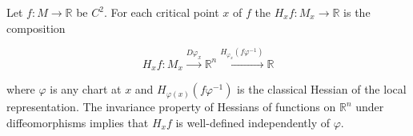 Let $f: M \to \mathbb{R}$ be $C^2$. For each critical point $x$ of $f$ the  $H_x f: M_x \to \mathbb{R}$ is the composition

$$H_x f: M_x \xrightarrow{D\varphi_x} \mathbb{R}^n \xrightarrow{H_{\varphi_x}(f\varphi^{-1})} \mathbb{R}$$

where $\varphi$ is any chart at $x$ and $H_{\varphi(x)}(f\varphi^{-1})$ is the classical Hessian of the local representation. The invariance property of Hessians of functions on $\mathbb{R}^n$ under diffeomorphisms implies that $H_x f$ is well-defined independently of $\varphi$.
